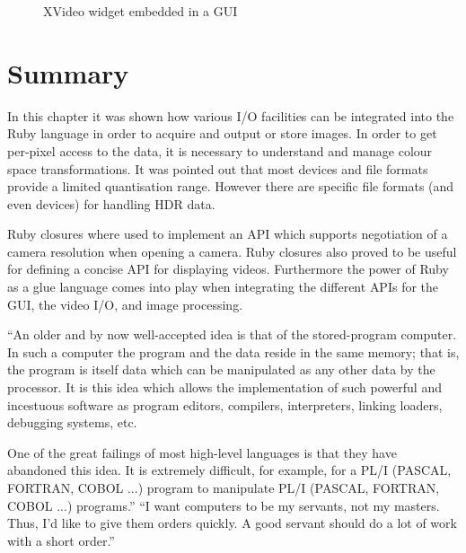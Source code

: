 \documentclass[12pt,a4paper,oneside,openright]{book}
\begin{document}
\begin{CJK}{UTF8}{}
\begin{figure}[htbp]
\begin{center}
    \caption{XVideo widget embedded in a \acs{GUI}\label{fig:xvwidget}}
  \end{center}
\end{figure}

\section{Summary}\label{cha:sumio}
In this chapter it was shown how various \ac{I}/\ac{O} facilities can be integrated into the Ruby language in order to acquire and output or store images. In order to get per-pixel access to the data, it is necessary to understand and manage colour space transformations. It was pointed out that most devices and file formats provide a limited quantisation range. However there are specific file formats (and even devices) for handling \ac{HDR} data.

Ruby closures where used to implement an \ac{API} which supports negotiation of a camera resolution when opening a camera. Ruby closures also proved to be useful for defining a concise \ac{API} for displaying videos. Furthermore the power of Ruby as a glue language comes into play when integrating the different \acp{API} for the \ac{GUI}, the video \ac{I}/\ac{O}, and image processing.

\begin{savequote}[8cm]
  \begin{singlespace}
    ``An older and by now well-accepted idea is that of the stored-program computer. In such a computer the program and the data reside in the same memory; that is, the program is itself data which can be manipulated as any other data by the processor. It is this idea which allows the implementation of such powerful and incestuous software as program editors, compilers, interpreters, linking loaders, debugging systems, etc.
    
    One of the great failings of most high-level languages is that they have abandoned this idea. It is extremely difficult, for example, for a PL/I (PASCAL, FORTRAN, COBOL ...) program to manipulate PL/I (PASCAL, FORTRAN, COBOL ...) programs.''
    ``I want computers to be my servants, not my masters. Thus, I’d like to give them orders quickly. A good servant should do a lot of work with a short order.''
  \end{singlespace}
\end{savequote}

\end{CJK}
\end{document}
